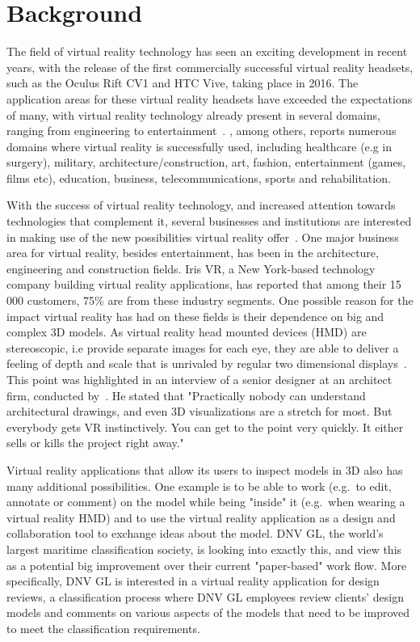 \section{Background}           
The field of virtual reality technology has seen an exciting development in recent years, 
with the release of the first commercially successful virtual reality headsets, such as the Oculus Rift CV1 and HTC Vive, taking place in 2016.
The application areas for these virtual reality headsets have exceeded the expectations of many, with virtual reality 
technology already present in several domains, ranging from engineering to entertainment~\citep{VRS2016}. 
\citet{VRS2016}, among others, reports numerous domains where virtual reality is successfully used, including 
healthcare (e.g in surgery), military, architecture/construction, art, fashion, entertainment (games, films etc), education, business, telecommunications, sports and rehabilitation.

With the success of virtual reality technology, and increased attention towards technologies that complement it, several businesses and institutions 
are interested in making use of the new possibilities virtual reality offer~\citep{TW22016}. One major business area for virtual reality, besides entertainment, 
has been in the architecture, engineering and construction fields. Iris VR, a New York-based technology company building virtual reality applications, has reported that
among their 15 000 customers, 75\% are from these industry segments. One possible reason for the impact virtual reality has had on these fields is their dependence 
on big and complex 3D models. As virtual reality head mounted devices (HMD) are stereoscopic, i.e provide separate images for each eye, they are able to deliver a feeling of 
depth and scale that is unrivaled by regular two dimensional displays~\citep{POLYGON2016}. This point was highlighted in an interview of a senior designer at an architect 
firm, conducted by~\citet{TW22016}. He stated that "Practically nobody can understand architectural drawings, and even 3D visualizations are a stretch for most. 
But everybody gets VR instinctively. You can get to the point very quickly. It either sells or kills the project right away." 

Virtual reality applications that allow its users to inspect models in 3D also has many additional possibilities. 
One example is to be able to work (e.g.~to edit, annotate or comment) on the model while being "inside" it (e.g.~when wearing a virtual reality HMD) and 
to use the virtual reality application as a design and collaboration tool to exchange ideas about the model.
DNV GL, the world's largest maritime classification society, is looking into exactly this, and view this as a potential big improvement over their current 
"paper-based" work flow. More specifically, DNV GL is interested in a virtual reality application for design reviews, a classification process where DNV GL employees review 
clients' design models and comments on various aspects of the models that need to be improved to meet the classification requirements. 


